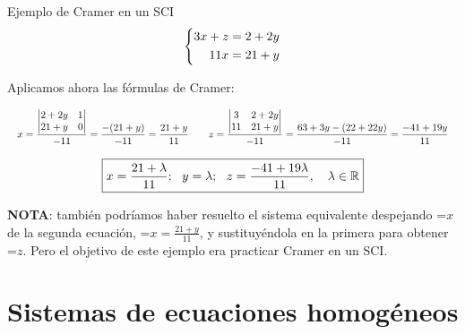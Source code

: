 \documentclass[11pt,a4paper]{article}
\newcommand{\fmm}[1]{\setbox0=\hbox{$#1$}\ifdim\wd0>\linewidth\fmdisp{#1}\else\mbox{\box0}\fi}
\newcommand{\fmdisp}[1]{\[\setbox2=\hbox{$\displaystyle #1$}\ifdim\wd2>\linewidth\resizebox{\linewidth}{!}{\box2}\else\box2\fi\]}
\newcommand{\fmuline}[1]{\textbf{\color{fmaccent}#1}}
\begin{document}
\begin{fmex}{Ejemplo de Cramer en un SCI}
\fmdisp{\left\{\begin{aligned}3x+z&=2+2y\\ 11x&=21+y\end{aligned}\right.}

Aplicamos ahora las fórmulas de Cramer:

\fmdisp{x=\frac{\begin{vmatrix}2+2y & 1\\ 21+y & 0\end{vmatrix}}{-11}=\frac{-(21+y)}{-11}=\frac{21+y}{11}\qquad z=\frac{\begin{vmatrix}3 & 2+2y\\ 11 & 21+y\end{vmatrix}}{-11}=\frac{63+3y-(22+22y)}{-11}=\frac{-41+19y}{11}}

\fmdisp{\boxed{x=\frac{21+\lambda}{11};\ \ y=\lambda;\ \ z=\frac{-41+19\lambda}{11},\quad\lambda\in\mathbb{R}}}

\vspace*{0.2cm}

\begin{fmnote}\fmuline{NOTA}: también podríamos haber resuelto el sistema equivalente despejando \fmm{x} de la segunda ecuación, \fmm{x=\frac{21+y}{11}}, y sustituyéndola en la primera para obtener \fmm{z}. Pero el objetivo de este ejemplo era practicar Cramer en un SCI.\end{fmnote}
\end{fmex}

\section{Sistemas de ecuaciones homogéneos}\hypertarget{sec4}{}
\end{document}
